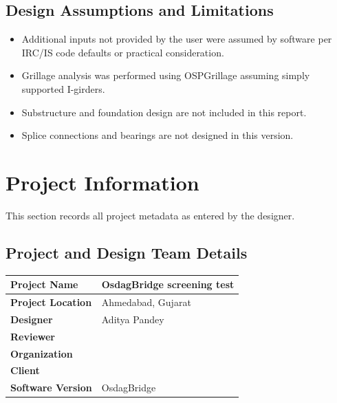 \documentclass[12pt,a4paper]{report}
\numberwithin{table}{chapter}
\numberwithin{figure}{chapter}
\begin{document}
\section*{Design Assumptions and Limitations}
\label{sec:assumptions}

\begin{itemize}
\item Additional inputs not provided by the user were assumed by software per IRC/IS code defaults or practical consideration.
\item Grillage analysis was performed using OSPGrillage assuming simply supported I-girders.
\item Substructure and foundation design are not included in this report.
\item Splice connections and bearings are not designed in this version.
\end{itemize}

\titleformat{\chapter}[block]{\normalfont\Large\bfseries\centering}{\thechapter}{1em}{}
\titlespacing*{\chapter}{0pt}{-30pt}{10pt}


\chapter{Project Information}

This section records all project metadata as entered by the designer.

\section{Project and Design Team Details}
\label{sec:project-details}

\begin{tabular}{|L{5.5cm}|L{8.5cm}|}
\hline
\textbf{Project Name} & OsdagBridge screening test \\
\hline
\textbf{Project Location} & Ahmedabad, Gujarat \\
\hline
\textbf{Designer} & Aditya Pandey \\
\hline
\textbf{Reviewer} &  \\
\hline
\textbf{Organization} &  \\
\hline
\textbf{Client} &  \\
\hline
\textbf{Software Version} & OsdagBridge \\
\hline
\end{tabular}
\end{document}
